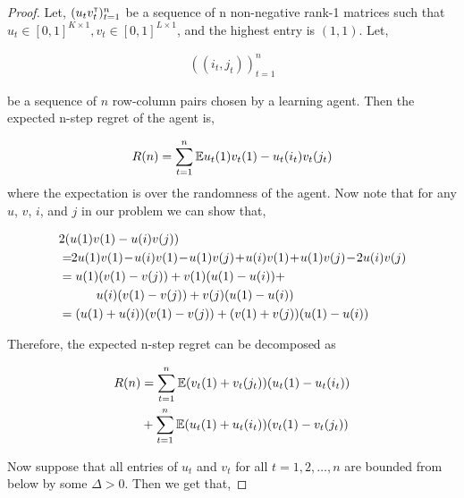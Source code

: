 \begin{proof}
Let, $(u_t v_t^\mathsf{\scriptscriptstyle T})_{t = 1}^n$ be a sequence of n non-negative rank-1  matrices such that $u_t \in [0, 1]^{K \times 1}, v_t \in [0, 1]^{L \times 1}$, and the highest entry is $(1, 1)$. Let,

\begin{align*}
((i_t, j_t))_{t = 1}^n
\end{align*}

be a sequence of $n$ row-column pairs chosen by a learning agent. Then the expected n-step regret of the agent is,

\begin{align*}
R(n) = \sum_{t = 1}^n \mathbb{E}{u_t(1) v_t(1) - u_t(i_t) v_t(j_t)}
\end{align*}
where the expectation is over the randomness of the agent. Now note that for any $u$, $v$, $i$, and $j$ in our problem we can show that,

\begin{align*}
& 2 (u(1) v(1) - u(i) v(j))\\
& = \!\! 2 u(1) v(1) \! - \! u(i) v(1) \! - \! u(1) v(j) \! + \! u(i) v(1) \! + \! u(1) v(j) \! - \! 2 u(i) v(j) \\
& = u(1) (v(1) - v(j))  + v(1) (u(1) -  u(i))  +\\
& \hspace*{3em}  u(i) (v(1)  - v(j))  + v(j) (u(1)  - u(i)) \\
& = (u(1) + u(i)) (v(1) - v(j)) + (v(1) + v(j)) (u(1) - u(i))
\end{align*}

Therefore, the expected n-step regret can be decomposed as

\begin{align*}
R(n) &= \sum_{t = 1}^n \mathbb{E}{(v_t(1) + v_t(j_t)) (u_t(1) - u_t(i_t))} \\
&+ \sum_{t = 1}^n \mathbb{E}{(u_t(1) + u_t(i_t)) (v_t(1) - v_t(j_t))}
\end{align*}

Now suppose that all entries of $u_t$ and $v_t$ for all $t=1,2,\ldots, n$ are bounded from below by some $\Delta > 0$. Then we get that,


\end{proof}
